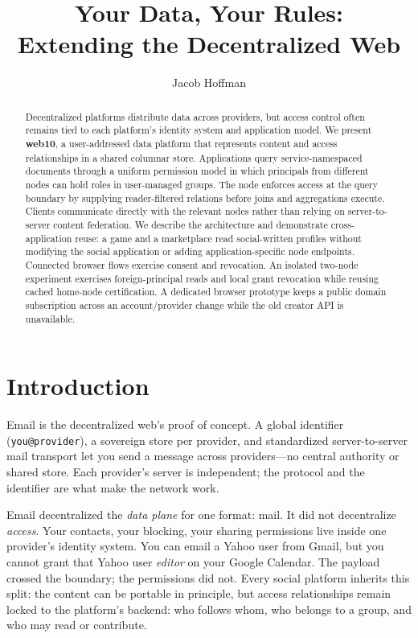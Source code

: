 \documentclass[sigconf, nonacm]{acmart}
\title{Your Data, Your Rules: \\ Extending the Decentralized Web}
\author{Jacob Hoffman}
\affiliation{\institution{Independent}\city{Baltimore}\country{USA}}
\begin{document}
\begin{abstract}
Decentralized platforms distribute data across providers, but access control
often remains tied to each platform's identity system and application model.
We present \textbf{web10}, a user-addressed data platform that represents
content and access relationships in a shared columnar store. Applications
query service-namespaced documents through a uniform permission model in which
principals from different nodes can hold roles in user-managed groups. The
node enforces access at the query boundary by supplying reader-filtered
relations before joins and aggregations execute. Clients communicate directly
with the relevant nodes rather than relying on server-to-server content
federation. We describe the architecture and demonstrate cross-application
reuse: a game and a marketplace read social-written profiles without modifying
the social application or adding application-specific node endpoints.
Connected browser flows exercise consent and revocation.
An isolated two-node experiment exercises foreign-principal reads and local
grant revocation while reusing cached home-node certification.
A dedicated browser prototype keeps a public domain subscription across an
account/provider change while the old creator API is unavailable.
\end{abstract}

\maketitle

\section{Introduction}
\label{sec:intro}

Email is the decentralized web's proof of concept. A global identifier
(\texttt{you@provider}), a sovereign store per provider, and standardized
server-to-server mail transport let you send a message across providers---no
central authority or shared store. Each provider's
server is independent; the protocol and the identifier are what make the
network work.

Email decentralized the \emph{data plane} for one format: mail. It did not
decentralize \emph{access}. Your contacts, your blocking, your sharing
permissions live inside one provider's identity system. You can email a Yahoo
user from Gmail, but you cannot grant that Yahoo user \emph{editor} on your
Google Calendar. The payload crossed the boundary; the permissions did not.
Every social platform inherits this split: the content can be portable in
principle, but access relationships remain locked to the platform's backend:
who follows whom, who belongs to a group, and who may read or contribute.
\end{document}
